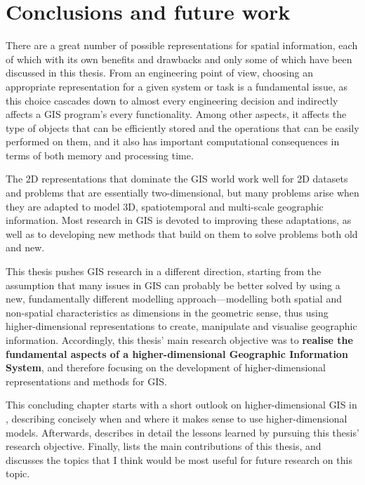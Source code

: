 
\chapter{Conclusions and future work}
\label{ch:conclusions}


There are a great number of possible representations for spatial information, each of which with its own benefits and drawbacks and only some of which have been discussed in this thesis.
From an engineering point of view, choosing an appropriate representation for a given system or task is a fundamental issue, as this choice cascades down to almost every engineering decision and indirectly affects a GIS program's every functionality.
Among other aspects, it affects the type of objects that can be efficiently stored and the operations that can be easily performed on them, and it also has important computational consequences in terms of both memory and processing time.

The 2D representations that dominate the GIS world work well for 2D datasets and problems that are essentially two-dimensional, but many problems arise when they are adapted to model 3D, spatiotemporal and multi-scale geographic information.
Most research in GIS is devoted to improving these adaptations, as well as to developing new methods that build on them to solve problems both old and new.

This thesis pushes GIS research in a different direction, starting from the assumption that many issues in GIS can probably be better solved by using a new, fundamentally different modelling approach---modelling both spatial and non-spatial characteristics as dimensions in the geometric sense, thus using higher-dimensional representations to create, manipulate and visualise geographic information.
Accordingly, this thesis' main research objective was to \textbf{realise the fundamental aspects of a higher-dimensional Geographic Information System}, and therefore focusing on the development of higher-dimensional representations and methods for GIS.\@

This concluding chapter starts with a short outlook on higher-dimensional GIS in , describing concisely 
when and where it makes sense to use higher-dimensional models.
Afterwards,  describes in detail the lessons learned by pursuing this thesis' research objective.
Finally,  lists the main contributions of this thesis, and  discusses the topics that I think would be most useful for future research on this topic.


